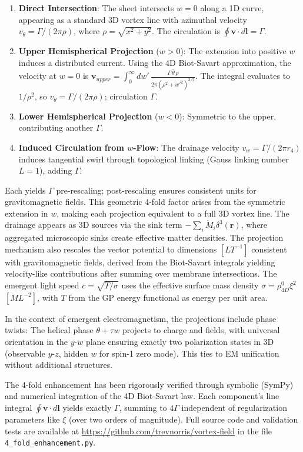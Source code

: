 \begin{enumerate}
\item \textbf{Direct Intersection}: The sheet intersects $w=0$ along a 1D curve, appearing as a standard 3D vortex line with azimuthal velocity $v_\theta = \Gamma / (2\pi \rho)$, where $\rho = \sqrt{x^2 + y^2}$. The circulation is $\oint \mathbf{v} \cdot d\mathbf{l} = \Gamma$.
\item \textbf{Upper Hemispherical Projection} ($w > 0$): The extension into positive $w$ induces a distributed current. Using the 4D Biot-Savart approximation, the velocity at $w=0$ is $\mathbf{v}_{upper} = \int_0^\infty dw' \, \frac{\Gamma \, \hat{\theta} \, \rho}{2\pi (\rho^2 + w'^2)^{3/2}}$. The integral evaluates to $1 / \rho^2$, so $v_\theta = \Gamma / (2\pi \rho)$; circulation $\Gamma$.
\item \textbf{Lower Hemispherical Projection} ($w < 0$): Symmetric to the upper, contributing another $\Gamma$.
\item \textbf{Induced Circulation from $w$-Flow}: The drainage velocity $v_w = \Gamma / (2\pi r_4)$ induces tangential swirl through topological linking (Gauss linking number $L=1$), adding $\Gamma$.
\end{enumerate}

Each yields $\Gamma$ pre-rescaling; post-rescaling ensures consistent units for gravitomagnetic fields. This geometric 4-fold factor arises from the symmetric extension in $w$, making each projection equivalent to a full 3D vortex line. The drainage appears as 3D sources via the sink term $-\sum_i \dot{M}_i \delta^3(\mathbf{r})$, where aggregated microscopic sinks create effective matter densities. The projection mechanism also rescales the vector potential to dimensions $[L T^{-1}]$ consistent with gravitomagnetic fields, derived from the Biot-Savart integrals yielding velocity-like contributions after summing over membrane intersections. The emergent light speed $c = \sqrt{T / \sigma}$ uses the effective surface mass density $\sigma = \rho_{4D}^0 \xi^2$ $[M L^{-2}]$, with $T$ from the GP energy functional as energy per unit area.

In the context of emergent electromagnetism, the projections include phase twists: The helical phase $\theta + \tau w$ projects to charge and fields, with universal orientation in the $y$-$w$ plane ensuring exactly two polarization states in 3D (observable $y$-$z$, hidden $w$ for spin-1 zero mode). This ties to EM unification without additional structures.

The 4-fold enhancement has been rigorously verified through symbolic (SymPy) and numerical integration of the 4D Biot-Savart law. Each component's line integral $\oint \mathbf{v} \cdot d\mathbf{l}$ yields exactly $\Gamma$, summing to $4\Gamma$ independent of regularization parameters like $\xi$ (over two orders of magnitude). Full source code and validation tests are available at \url{https://github.com/trevnorris/vortex-field} in the file \verb|4_fold_enhancement.py|.

